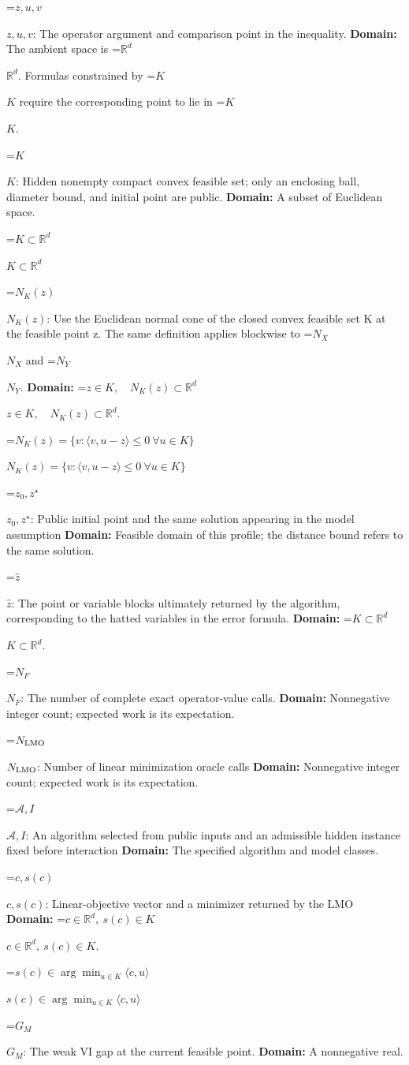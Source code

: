 \documentclass[10pt,a4paper]{article}
\newcommand{\AtlasMath}[1]{\par\begingroup\centering\setbox0=\hbox{$\displaystyle #1$}\ifdim\wd0>1.4\linewidth\typeout{ATLAS WIDE FORMULA: \the\wd0}\fi\ifdim\wd0>\linewidth\resizebox{\linewidth}{!}{\box0}\else\box0\fi\par\endgroup}
\newcommand{\AtlasInlineMath}[1]{\begingroup\setbox0=\hbox{$#1$}\ifdim\wd0>.4\linewidth\endgroup\AtlasMath{#1}\else\endgroup$#1$\fi}
\begin{document}
\AtlasInlineMath{z,u,v}: The operator argument and comparison point in the inequality. \textbf{Domain:} The ambient space is \AtlasInlineMath{\mathbb R^d}. Formulas constrained by \AtlasInlineMath{K} require the corresponding point to lie in \AtlasInlineMath{K}.

\AtlasInlineMath{K}: Hidden nonempty compact convex feasible set; only an enclosing ball, diameter bound, and initial point are public. \textbf{Domain:} A subset of Euclidean space.

\AtlasInlineMath{K\subset\mathbb R^d}

\AtlasInlineMath{N_K(z)}: Use the Euclidean normal cone of the closed convex feasible set K at the feasible point z. The same definition applies blockwise to \AtlasInlineMath{N_X} and \AtlasInlineMath{N_Y}. \textbf{Domain:} \AtlasInlineMath{z\in K,\quad N_K(z)\subset\mathbb R^d}.

\AtlasInlineMath{N_K(z)=\{v:\langle v,u-z\rangle\le0\ \forall u\in K\}}

\AtlasInlineMath{z_0,z^\star}: Public initial point and the same solution appearing in the model assumption \textbf{Domain:} Feasible domain of this profile; the distance bound refers to the same solution.

\AtlasInlineMath{\widehat z}: The point or variable blocks ultimately returned by the algorithm, corresponding to the hatted variables in the error formula. \textbf{Domain:} \AtlasInlineMath{K\subset\mathbb R^d}.

\AtlasInlineMath{N_F}: The number of complete exact operator-value calls. \textbf{Domain:} Nonnegative integer count; expected work is its expectation.

\AtlasInlineMath{N_{\rm LMO}}: Number of linear minimization oracle calls \textbf{Domain:} Nonnegative integer count; expected work is its expectation.

\AtlasInlineMath{\mathcal A,I}: An algorithm selected from public inputs and an admissible hidden instance fixed before interaction \textbf{Domain:} The specified algorithm and model classes.

\AtlasInlineMath{c,s(c)}: Linear-objective vector and a minimizer returned by the LMO \textbf{Domain:} \AtlasInlineMath{c\in\mathbb R^d,\ s(c)\in K}.

\AtlasInlineMath{s(c)\in\arg\min_{u\in K}\langle c,u\rangle}

\AtlasInlineMath{G_M}: The weak VI gap at the current feasible point. \textbf{Domain:} A nonnegative real.
\end{document}
